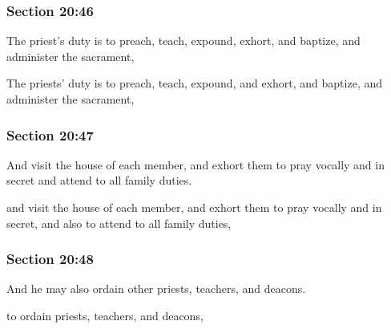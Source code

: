	\subsubsection{Section 20:46} %
		\label{DC20-46}

		The priest's duty is to preach, teach, expound, exhort, and baptize, and administer the sacrament,

		\begin{framed}
		\scriptsize
			\begin{compactdesc}
				\item[JSP] The priests' duty is to preach, teach, expound, and exhort, and baptize, and administer the sacrament,
				\item[RB1] 
				\item[BC] 
			\end{compactdesc}
		\end{framed}

	\subsubsection{Section 20:47} %
		\label{DC20-47}

		And visit the house of each member, and exhort them to pray vocally and in secret and attend to all family duties.

		\begin{framed}
		\scriptsize
			\begin{compactdesc}
				\item[JSP] and visit the house of each member, and exhort them to pray vocally and in secret, and also to attend to all family duties,
				\item[RB1] 
				\item[BC] 
			\end{compactdesc}
		\end{framed}

	\subsubsection{Section 20:48} %
		\label{DC20-48}

		And he may also ordain other priests, teachers, and deacons.

		\begin{framed}
		\scriptsize
			\begin{compactdesc}
				\item[JSP] to ordain priests, teachers, and deacons, 
				\item[RB1] 
				\item[BC] 
			\end{compactdesc}
		\end{framed}

